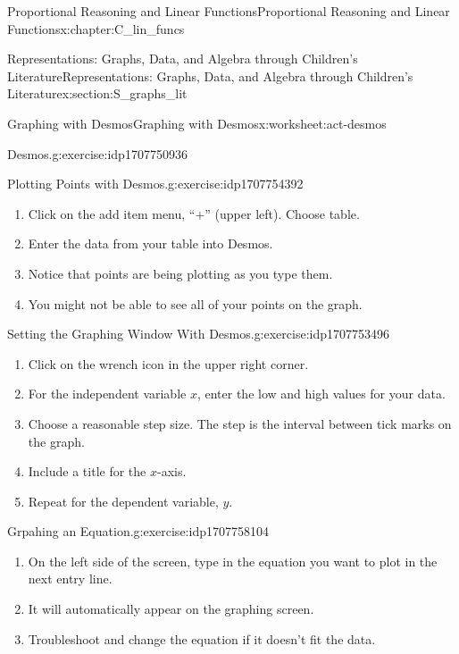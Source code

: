 \documentclass[oneside,10pt,]{book}
\numberwithin{equation}{chapter}
\begin{document}
\begin{chapterptx}{Proportional Reasoning and Linear Functions}{}{Proportional Reasoning and Linear Functions}{}{}{x:chapter:C_lin_funcs}
\begin{sectionptx}{Representations: Graphs, Data, and Algebra through Children's Literature}{}{Representations: Graphs, Data, and Algebra through Children's Literature}{}{}{x:section:S_graphs_lit}
\begin{worksheet-subsection}{Graphing with Desmos}{}{Graphing with Desmos}{}{}{x:worksheet:act-desmos}
\begin{divisionexercise}{1}{Desmos.}{}{g:exercise:idp1707750936}
\begin{enumerate}[font=\bfseries,label=(\alph*),ref=\alph*]
\end{enumerate}
\end{divisionexercise}%
\begin{divisionexercise}{2}{Plotting Points with Desmos.}{}{g:exercise:idp1707754392}%
\begin{enumerate}[font=\bfseries,label=(\alph*),ref=\alph*]
\item{}Click on the add item menu, ``+'' (upper left). Choose table.%
\item{}Enter the data from your table into Desmos.%
\item{}Notice that points are being plotting as you type them.%
\item{}You might not be able to see all of your points on the graph.%
\end{enumerate}
\end{divisionexercise}%
\begin{divisionexercise}{3}{Setting the Graphing Window With Desmos.}{}{g:exercise:idp1707753496}%
\begin{enumerate}[font=\bfseries,label=(\alph*),ref=\alph*]
\item{}Click on the wrench icon in the upper right corner.%
\item{}For the independent variable \(x\), enter the low and high values for your data.%
\item{}Choose a reasonable step size. The step is the interval between tick marks on the graph.%
\item{}Include a title for the \(x\)-axis.%
\item{}Repeat for the dependent variable, \(y\).%
\end{enumerate}
\end{divisionexercise}%
\begin{divisionexercise}{4}{Grpahing an Equation.}{}{g:exercise:idp1707758104}%
\begin{enumerate}[font=\bfseries,label=(\alph*),ref=\alph*]
\item{}On the left side of the screen, type in the equation you want to plot in the next entry line.%
\item{}It will automatically appear on the graphing screen.%
\item{}Troubleshoot and change the equation if it doesn't fit the data.%
\end{enumerate}
\end{divisionexercise}%
\end{worksheet-subsection}
\restoregeometry
%
%
\typeout{************************************************}

\end{sectionptx}
\end{chapterptx}
\end{document}
